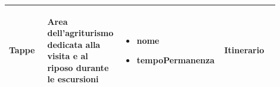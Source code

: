 \documentclass[12pt,a4paper]{article}
\begin{document}
\begin{center}
\begin{longtable}{|p{0.14\linewidth}|p{0.20\linewidth}|p{0.36\linewidth}|p{0.20\linewidth}|}
\hline
Tappe				 	& \begin{flushleft}\vspace{-25pt} Area dell'agriturismo dedicata alla visita e al riposo durante le escursioni \end{flushleft}
					& \begin{itemize}
						\setlength{\itemindent}{-1em}
						\vspace{-25pt}
						\setlength\itemsep{-0.25em}
						\item nome
						\item tempoPermanenza
					\end{itemize}
					& \begin{flushleft}\vspace{-25pt} Itinerario \end{flushleft} \\ 

\hline


\end{longtable}
\end{center}
\pagebreak
\end{document}
